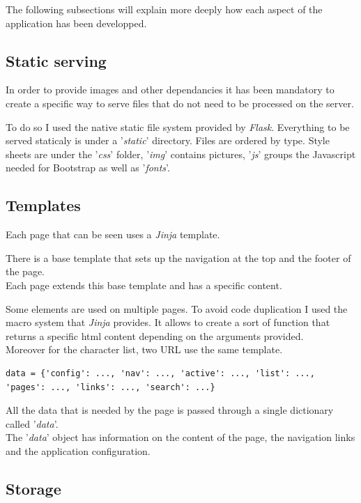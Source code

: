 \documentclass[10pt, a4paper]{article}
\begin{document}
	The following subsections will explain more deeply how each aspect of the application has been developped.
	
	\subsection{Static serving}
	In order to provide images and other dependancies it has been mandatory to create a specific way to serve files that do not need to be processed on the server.
	
	To do so I used the native static file system provided by \textit{Flask}. Everything to be served staticaly is under a '\textit{static}' directory. Files are ordered by type. Style sheets are under the '\textit{css}' folder, '\textit{img}' contains pictures, '\textit{js}' groups the Javascript needed for Bootstrap as well as '\textit{fonts}'.
	
	\subsection{Templates}
	Each page that can be seen uses a \textit{Jinja} template.
	
	There is a base template that sets up the navigation at the top and the footer of the page. \\	
	Each page extends this base template and has a specific content.
	
	Some elements are used on multiple pages. To avoid code duplication I used the macro system that \textit{Jinja} provides. It allows to create a sort of function that returns a specific html content depending on the arguments provided. \\
	Moreover for the character list, two URL use the same template.
	
	\begin{lstlisting}[caption = The 'data' object]
	data = {'config': ..., 'nav': ..., 'active': ..., 'list': ..., 'pages': ..., 'links': ..., 'search': ...}\end{lstlisting}
	
	All the data that is needed by the page is passed through a single dictionary called '\textit{data}'. \\
	The '\textit{data}' object has information on the content of the page, the navigation links and the application configuration.
	
	\subsection{Storage}
	
\end{document}
